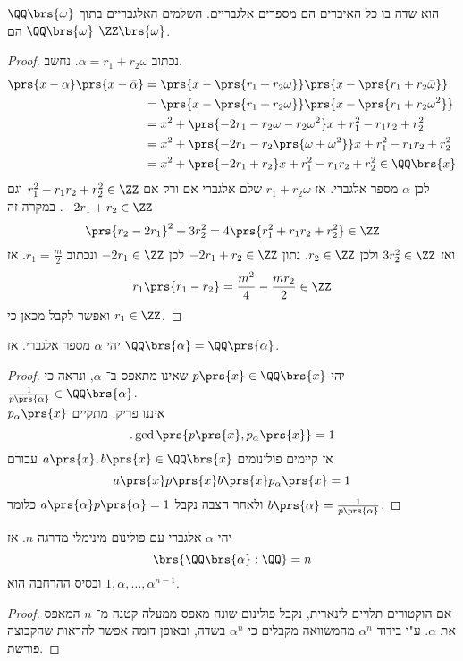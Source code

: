 \documentclass[a4paper,10pt,twoside,openany]{book}
\begin{document}
\begin{proposition}
$\QQ\brs{\omega}$
הוא שדה בו כל האיברים הם מספרים אלגבריים.
השלמים האלגבריים בתוך
$\QQ\brs{\omega}$
הם
$\ZZ\brs{\omega}$.
\end{proposition}
\begin{proof}
נכתוב
$\alpha = r_1 + r_2 \omega$.
נחשב.
\begin{align*}
\prs{x-\alpha}\prs{x-\bar{\alpha}} &=
\prs{x-\prs{r_1 + r_2 \omega}} \prs{x-\prs{r_1 + r_2\bar{\omega}}} \\&=
\prs{x - \prs{r_1 + r_2 \omega}} \prs{x-\prs{r_1 + r_2 \omega^2}} \\&=
x^2 + \prs{-2r_1 - r_2 \omega - r_2 \omega^2} x + r_1^2 - r_1 r_2 + r_2^2 \\&=
x^2 + \prs{-2r_1 - r_2\prs{\omega + \omega^2}} x + r_1^2 - r_1 r_2 + r_2^2 \\
&= x^2 + \prs{-2r_1 + r_2} x + r_1^2 - r_1 r_2 + r_2^2 \in \QQ\brs{x}
\end{align*}
לכן
$\alpha$
מספר אלגברי.
אז
$r_1 + r_2\omega$
שלם אלגברי אם ורק אם
$r_1^2 - r_1 r_2 + r_2^2 \in \ZZ$
וגם
$-2r_1 + r_2 \in \ZZ$.
במקרה זה
\[\prs{r_2 - 2 r_1}^2 + 3r_2^2 = 4\prs{r_1^2 + r_1r_2 + r_2^2} \in \ZZ\]
ואז
$3r_2^2 \in \ZZ$
ולכן
$r_2 \in \ZZ$.
נתון
$-2r_1 + r_2 \in \ZZ$
לכן
$-2r_1 \in \ZZ$
ונכתוב
$r_1 = \frac{m}{2}$.
אז
\[r_1 \prs{r_1 - r_2} = \frac{m^2}{4} - \frac{m r_2}{2} \in \ZZ\]
ואפשר לקבל מכאן כי
$r_1 \in \ZZ$.
\end{proof}
\begin{proposition}
יהי
$\alpha$
מספר אלגברי.
אז
$\QQ\brs{\alpha} = \QQ\prs{\alpha}$.
\end{proposition}
\begin{proof}
יהי
$p\prs{x} \in \QQ\brs{x}$
שאינו מתאפס ב־%
$\alpha$,
ונראה כי
$\frac{1}{p\prs{\alpha}} \in \QQ\brs{\alpha}$.\\
$p_{\alpha}\prs{x}$
איננו פריק.
מתקיים
\[\text{.} \gcd\prs{p\prs{x}, p_{\alpha}\prs{x}} = 1\]
אז קיימים פולינומים
$a\prs{x},b\prs{x} \in \QQ\brs{x}$
עבורם
\[a\prs{x} p\prs{x}  b\prs{x} p_{\alpha}\prs{x} = 1\]
ולאחר הצבה נקבל
$a\prs{\alpha} p\prs{\alpha} = 1$
כלומר
$b\prs{\alpha} = \frac{1}{p\prs{\alpha}}$.
\end{proof}

\begin{proposition}
יהי
$\alpha$
אלגברי עם פולינום מינימלי מדרגה
$n$.
אז
\[\brs{\QQ\brs{\alpha} : \QQ} = n\]
ובסיס ההרחבה הוא
$1,\alpha,\ldots, \alpha^{n-1}$.
\end{proposition}

\begin{proof}
אם הוקטורים תלויים לינארית, נקבל פולינום שונה מאפס ממעלה קטנה מ־%
$n$
המאפס את
$\alpha$.
ע"י בידוד
$\alpha^n$
מהמשוואה מקבלים כי
$\alpha^n$
בשדה, ובאופן דומה אפשר להראות שהקבוצה פורשת.
\end{proof}
\end{document}
